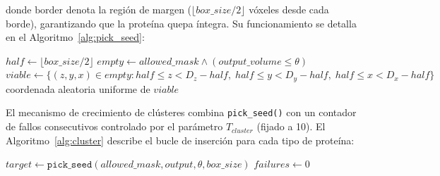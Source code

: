 \begin{enumerate}
    donde $\text{border}$ denota la región de margen ($\lfloor box\_size/2 \rfloor$ vóxeles desde cada borde), garantizando que la proteína quepa íntegra. Su funcionamiento se detalla en el Algoritmo~\ref{alg:pick_seed}:

    \begin{algorithm}[H]
        \caption{\texttt{pick\_seed}: muestreo uniforme de semilla válida}
        \label{alg:pick_seed}
        $half \gets \lfloor box\_size / 2 \rfloor$\;
        $empty \gets allowed\_mask \land (output\_volume \leq \theta)$\;
        $viable \gets \{(z,y,x) \in empty : half \leq z < D_z{-}half,\; half \leq y < D_y{-}half,\; half \leq x < D_x{-}half\}$\;
        \Return coordenada aleatoria uniforme de $viable$\;
    \end{algorithm}

    El mecanismo de crecimiento de clústeres combina \texttt{pick\_seed()} con un contador de fallos consecutivos controlado por el parámetro  \texttt{$T_{cluster}$} (fijado a 10). El Algoritmo~\ref{alg:cluster} describe el bucle de inserción para cada tipo de proteína:

    \begin{algorithm}[H]
        \caption{Crecimiento de clúster guiado por semilla}
        \label{alg:cluster}
        $target \gets \texttt{pick\_seed}(allowed\_mask, output, \theta, box\_size)$\;
        $failures \gets 0$\;
    \end{algorithm}


\end{enumerate}

